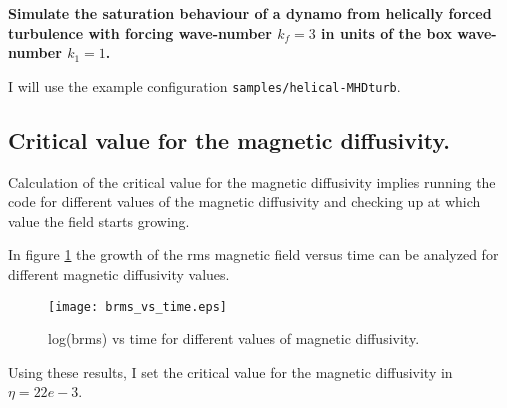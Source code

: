 
\textbf{Simulate the saturation behaviour of a dynamo from helically forced turbulence with forcing wave-number $k_f = 3$ in units of the box wave-number $k_1 = 1$.}

I will use the example configuration \texttt{samples/helical-MHDturb}.

\subsection{Critical value for the magnetic diffusivity.}

Calculation of the critical value for the magnetic diffusivity implies running the code for different values of the magnetic diffusivity and checking up at which value the field starts growing.

In figure \ref{fig:brmst} the growth of the rms magnetic field versus time can be analyzed for different magnetic diffusivity values.

\begin{figure}[h]
\centering
\texttt{[image: brms\_vs\_time.eps]}
\caption{log(brms) vs time for different values of  magnetic diffusivity.}
\label{fig:brmst}
 \end{figure}

Using these results, I set the critical value for the magnetic diffusivity in $\eta = 22e-3$.

